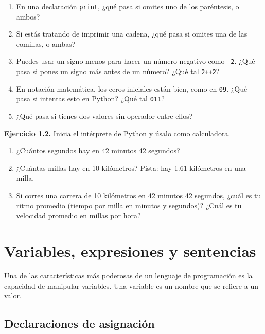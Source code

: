 \documentclass[12pt,letterpaper]{book}
\begin{document}
\begin{enumerate}
\item En una declaración \texttt{print}, ¿qué pasa si omites uno de los paréntesis, o ambos?

\item Si estás tratando de imprimir una cadena, ¿qué pasa si omites una de las comillas, o ambas?

\item Puedes usar un signo menos para hacer un número negativo como \texttt{-2}. ¿Qué pasa si pones un signo más antes de un número? ¿Qué tal \texttt{2++2}?

\item En notación matemática, los ceros iniciales están bien, como en \texttt{09}. ¿Qué pasa si intentas esto en Python? ¿Qué tal \texttt{011}?

\item ¿Qué pasa si tienes dos valores sin operador entre ellos?
\end{enumerate}

\textbf{Ejercicio 1.2.} Inicia el intérprete de Python y úsalo como calculadora.

\begin{enumerate}
\item ¿Cuántos segundos hay en 42 minutos 42 segundos?

\item ¿Cuántas millas hay en 10 kilómetros? Pista: hay 1.61 kilómetros en una milla.

\item Si corres una carrera de 10 kilómetros en 42 minutos 42 segundos, ¿cuál es tu ritmo promedio (tiempo por milla en minutos y segundos)? ¿Cuál es tu velocidad promedio en millas por hora?
\end{enumerate}







\chapter{Variables, expresiones y sentencias}
Una de las características más poderosas de un lenguaje de programación es la capacidad de manipular variables. Una variable es un nombre que se refiere a un valor.

\section{Declaraciones de asignación}
\end{document}
